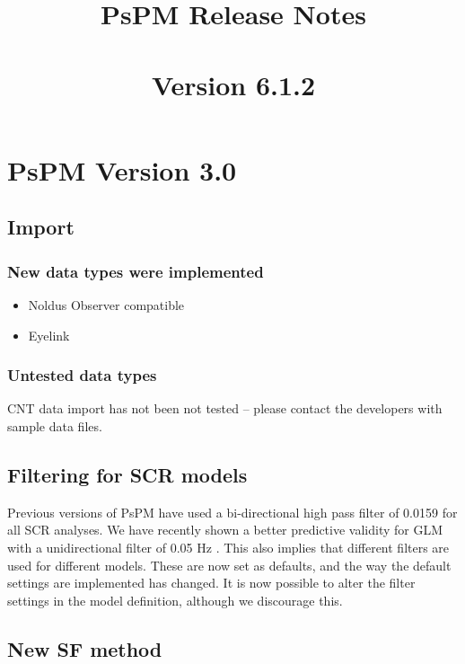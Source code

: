 \documentclass[english]{article}
\title{PsPM Release Notes\\ ~\\ Version 6.1.2}
\numberwithin{equation}{section}
\numberwithin{figure}{section}
\begin{document}
\maketitle
\date
\pagebreak


\tableofcontents{}
\pagebreak

\section{PsPM Version 3.0}

\subsection*{Import}

\subsubsection*{New data types were implemented}
\begin{itemize}
\item Noldus Observer compatible 
\item Eyelink
\end{itemize}

\subsubsection*{Untested data types}

CNT data import has not been not tested -- please contact the developers
with sample data files. 

\subsection*{Filtering for SCR models}

Previous versions of PsPM have used a bi-directional high pass filter
of 0.0159 for all SCR analyses. We have recently shown a better predictive
validity for GLM with a unidirectional filter of 0.05 Hz \cite{Bach:2013aa}.
This also implies that different filters are used for different models.
These are now set as defaults, and the way the default settings are
implemented has changed. It is now possible to alter the filter settings
in the model definition, although we discourage this.

\subsection*{New SF method}
\end{document}
